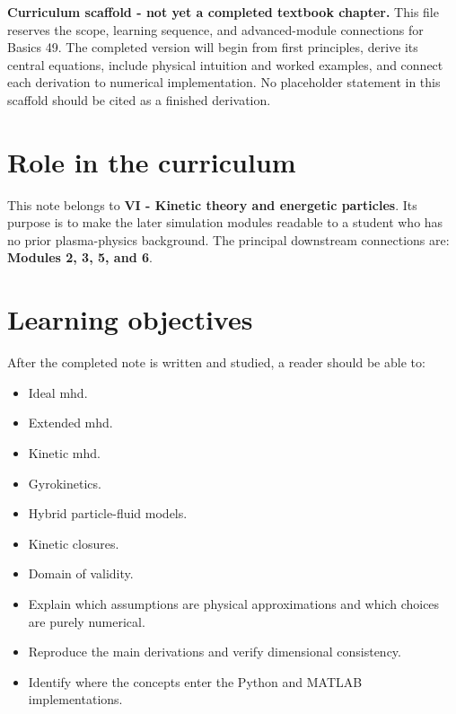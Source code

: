 \documentclass[11pt]{article}
\begin{document}

\begin{overviewbox}
\textbf{Curriculum scaffold - not yet a completed textbook chapter.} This file reserves the scope, learning sequence, and advanced-module connections for Basics 49. The completed version will begin from first principles, derive its central equations, include physical intuition and worked examples, and connect each derivation to numerical implementation. No placeholder statement in this scaffold should be cited as a finished derivation.
\end{overviewbox}

\ProjectTOC

\section{Role in the curriculum}
This note belongs to \textbf{VI - Kinetic theory and energetic particles}. Its purpose is to make the later simulation modules readable to a student who has no prior plasma-physics background. The principal downstream connections are: \textbf{Modules 2, 3, 5, and 6}.

\section{Learning objectives}
After the completed note is written and studied, a reader should be able to:
\begin{itemize}[leftmargin=1.6em]
\item Ideal mhd.
\item Extended mhd.
\item Kinetic mhd.
\item Gyrokinetics.
\item Hybrid particle-fluid models.
\item Kinetic closures.
\item Domain of validity.
\item Explain which assumptions are physical approximations and which choices are purely numerical.
\item Reproduce the main derivations and verify dimensional consistency.
\item Identify where the concepts enter the Python and MATLAB implementations.
\end{itemize}
\end{document}
